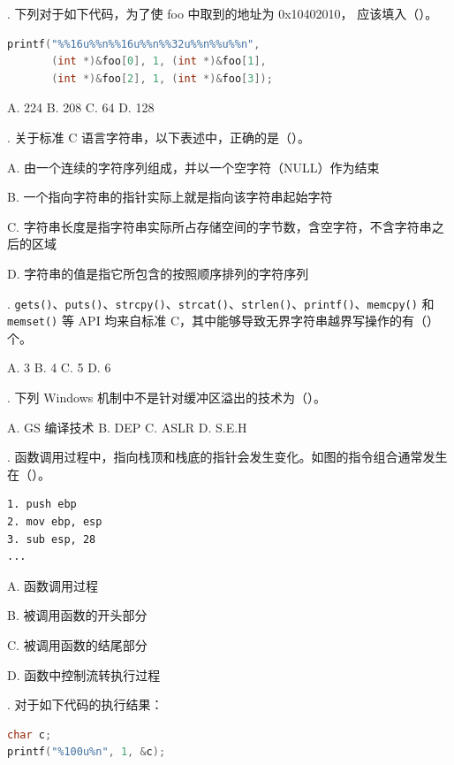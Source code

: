 \documentclass[UTF8]{ctexart}
\begin{document}
. 下列对于如下代码，为了使 foo 中取到的地址为 0x10402010，\underline{\hspace{2cm}} 应该填入（\quad）。

\begin{lstlisting}[language=C]
printf("%%16u%%n%%16u%%n%%32u%%n%%u%%n",
       (int *)&foo[0], 1, (int *)&foo[1],
       (int *)&foo[2], 1, (int *)&foo[3]);
\end{lstlisting}

\noindent
A. 224 \quad
B. 208 \quad
C. 64 \quad
D. 128

. 关于标准 C 语言字符串，以下表述中，正确的是（\quad）。

\noindent
A. 由一个连续的字符序列组成，并以一个空字符（NULL）作为结束

\noindent
B. 一个指向字符串的指针实际上就是指向该字符串起始字符

\noindent
C. 字符串长度是指字符串实际所占存储空间的字节数，含空字符，不含字符串之后的区域

\noindent
D. 字符串的值是指它所包含的按照顺序排列的字符序列


. \texttt{gets()}、\texttt{puts()}、\texttt{strcpy()}、\texttt{strcat()}、\texttt{strlen()}、\texttt{printf()}、\texttt{memcpy()} 和 \texttt{memset()} 等 API 均来自标准 C，其中能够导致无界字符串越界写操作的有（\quad）个。

\noindent
A. 3 \quad
B. 4 \quad
C. 5 \quad
D. 6

. 下列 Windows 机制中不是针对缓冲区溢出的技术为（\quad）。

\noindent
A. GS 编译技术 \quad
B. DEP \quad
C. ASLR \quad
D. S.E.H

. 函数调用过程中，指向栈顶和栈底的指针会发生变化。如图的指令组合通常发生在（\quad）。

\begin{lstlisting}
1. push ebp
2. mov ebp, esp
3. sub esp, 28
...
\end{lstlisting}

\noindent
A. 函数调用过程

\noindent
B. 被调用函数的开头部分

\noindent
C. 被调用函数的结尾部分

\noindent
D. 函数中控制流转执行过程

\vspace{0.8em}

. 对于如下代码的执行结果：

\begin{lstlisting}[language=C]
char c;
printf("%100u%n", 1, &c);
\end{lstlisting}
\end{document}
